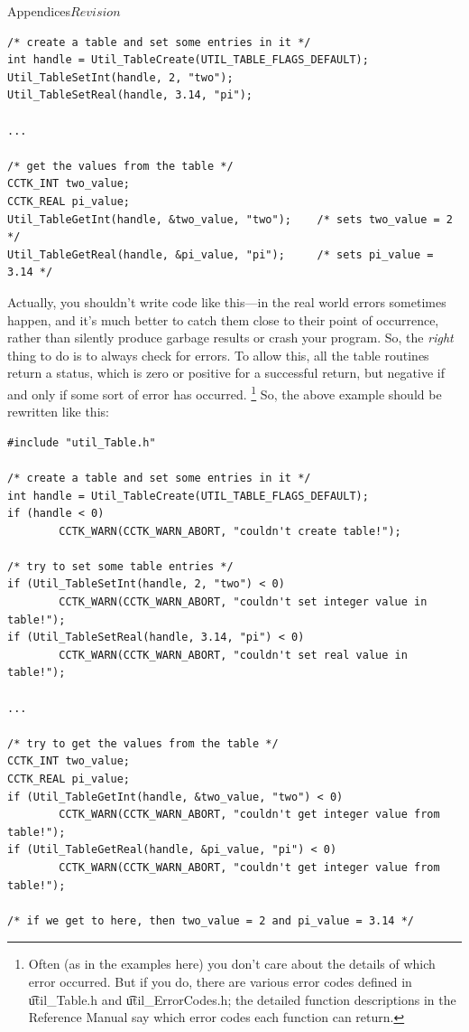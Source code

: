 \begin{cactuspart}{Appendices}{}{$Revision$}
\begin{verbatim}
/* create a table and set some entries in it */
int handle = Util_TableCreate(UTIL_TABLE_FLAGS_DEFAULT);
Util_TableSetInt(handle, 2, "two");
Util_TableSetReal(handle, 3.14, "pi");

...

/* get the values from the table */
CCTK_INT two_value;
CCTK_REAL pi_value;
Util_TableGetInt(handle, &two_value, "two");    /* sets two_value = 2 */
Util_TableGetReal(handle, &pi_value, "pi");     /* sets pi_value = 3.14 */
\end{verbatim}

Actually, you shouldn't write code like this---in the real world
errors sometimes happen, and it's much better to catch them close to
their point of occurrence, rather than silently produce garbage results
or crash your program.  So, the \emph{right} thing to do is to always
check for errors.  To allow this, all the table routines return a status,
which is zero or positive for a successful return, but negative if
and only if some sort of error has occurred.%
\footnote{%
	 Often (as in the examples here) you don't care
	 about the details of which error occurred.  But if
	 you do, there are various error codes defined in
	 {\t util\_Table.h} and {\t util\_ErrorCodes.h};
	 the detailed function descriptions in
	 the Reference Manual
	 say which error codes each function can return.
	 }%
{}  So, the above example should be rewritten like this:

\begin{verbatim}
#include "util_Table.h"

/* create a table and set some entries in it */
int handle = Util_TableCreate(UTIL_TABLE_FLAGS_DEFAULT);
if (handle < 0)
        CCTK_WARN(CCTK_WARN_ABORT, "couldn't create table!");

/* try to set some table entries */
if (Util_TableSetInt(handle, 2, "two") < 0)
        CCTK_WARN(CCTK_WARN_ABORT, "couldn't set integer value in table!");
if (Util_TableSetReal(handle, 3.14, "pi") < 0)
        CCTK_WARN(CCTK_WARN_ABORT, "couldn't set real value in table!");

...

/* try to get the values from the table */
CCTK_INT two_value;
CCTK_REAL pi_value;
if (Util_TableGetInt(handle, &two_value, "two") < 0)
        CCTK_WARN(CCTK_WARN_ABORT, "couldn't get integer value from table!");
if (Util_TableGetReal(handle, &pi_value, "pi") < 0)
        CCTK_WARN(CCTK_WARN_ABORT, "couldn't get integer value from table!");

/* if we get to here, then two_value = 2 and pi_value = 3.14 */
\end{verbatim}


\end{cactuspart}
